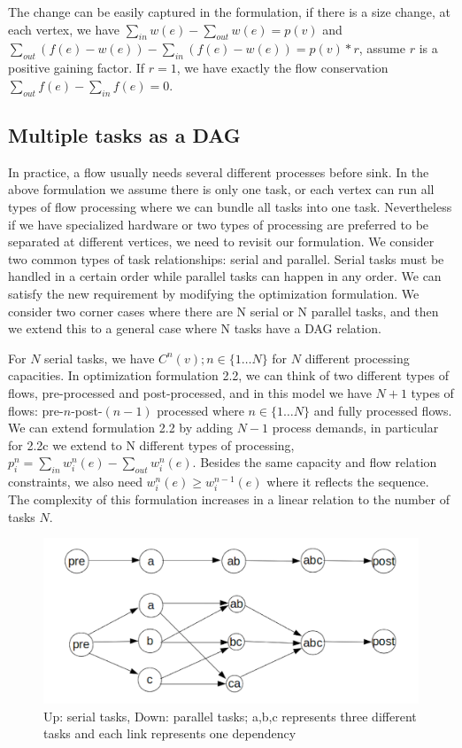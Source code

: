 The change can be easily captured in the formulation, if there is a size change, at each vertex, we have $\sum\limits_{in} w(e) - \sum\limits_{out}  w(e) = p(v)$ and $\sum\limits_{out} (f(e) - w(e))-\sum\limits_{in}  (f(e) - w(e))= p(v)*r$, assume $r$ is a positive gaining factor. If $r=1$, we have exactly the flow conservation $\sum\limits_{out} f(e) -\sum\limits_{in}  f(e)= 0$. 


\subsection{Multiple tasks as a DAG}
In practice, a flow usually needs several different processes before sink. In the above formulation we assume there is only one task, or each vertex can run all types of flow processing where we can bundle all tasks into one task. Nevertheless if we have specialized hardware or two types of processing are preferred to be separated at different vertices, we need to revisit our formulation. 
We consider two common types of task relationships: serial and parallel. Serial tasks must be handled in a certain order while parallel tasks can happen in any order. We can satisfy the new requirement by modifying the optimization formulation. We consider two corner cases where there are N serial or N parallel tasks, and then we extend this to a general case where N tasks have a DAG relation. 

For $N$ serial tasks, we have $C^n(v); n\in\{1\dots N\}$ for $N$ different processing capacities. In optimization formulation 2.2, we can think of two different types of flows, pre-processed and post-processed, and in this model we have $N+1$ types of flows: pre-$n$-post-$(n-1)$ processed where $ n\in\{1\dots N\}$ and  fully processed flows. We can extend formulation 2.2 by adding $N-1$ process demands, in particular for 2.2c we extend to N different types of processing, $p_i^n= \sum\limits_{in} w_i^n(e) - \sum\limits_{out} w_i^n(e)$. Besides the same capacity and flow relation constraints, we also need $w_i^n(e) \geq w_i^{n-1}(e)$ where it reflects the sequence. The complexity of this formulation increases in a linear relation to the number of tasks $N$.
\begin{figure}
 \includegraphics[width=\linewidth]{task.png}
 \caption{Up: serial tasks, Down: parallel tasks; a,b,c represents three different tasks and each link represents one dependency}
\end{figure}


